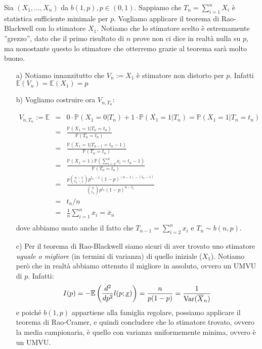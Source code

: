 \begin{esempio}

Sia $(X_1,...,X_n)$ da $b(1,p), p \in (0,1)$. Sappiamo che $T_n=\sum_{i=1}^n X_i$ è statistica sufficiente minimale per $p$. Vogliamo applicare il teorema di Rao-Blackwell con lo stimatore $X_1$. Notiamo che lo stimatore scelto è estremamente ''grezzo'', dato che il primo risultato di $n$ prove non ci dice in realtà nulla su $p$, ma nonostante questo lo stimatore che otterremo grazie al teorema sarà molto buono.

\begin{enumerate}
\item[a)] Notiamo innanzitutto che $V_n:=X_1$ è stimatore non distorto per $p$. Infatti $\mathbb{E}(V_n) = \mathbb{E}(X_1) = p$
\item[b)] Vogliamo costruire ora $V_{n,T_n}$:

\begin{eqnarray*}
V_{n,T_n} := \mathbb{E}
&=& 0 \cdot \mathbb{P} (X_1=0|T_n) + 1 \cdot \mathbb{P}(X_1=1|T_n) = \mathbb{P}(X_1=1|T_n=t_n)\\
&=& \frac{\mathbb{P}(X_1=1|T_n=t_n)}{\mathbb{P}(T_n=t_n)}\\
&=& \frac{\mathbb{P}(X_1=1|T_{n-1}=t_n-1)}{\mathbb{P}(T_n=t_n)}\\
&=& \frac{\mathbb{P}(X_1=1) \mathbb{P}(\sum_{i=2}^n x_i = t_n-1)}{\mathbb{P}(T_n=t_n)}\\
&=& \frac{p \binom{n-1}{t_n-1} p^{t_n-1} (1-p)^{(n-1)-(t_n-1)}}{\binom{n}{t_n} p^{t_n} (1-p)^{n-t_n}}\\
&=& t_n/n\\
&=& \frac{1}{n} \displaystyle\sum_{i=1}^n x_i = \overline{x}_n\\
\end{eqnarray*}
dove abbiamo usato anche il fatto che $T_{n-1}=\sum_{i=2}^n x_i$ e $T_n \sim b(n,p)$.
\item[c)] Per il teorema di Rao-Blackwell siamo sicuri di aver trovato uno stimatore \emph{uguale o migliore} (in termini di varianza) di quello iniziale ($X_1$). Notiamo però che in realtà abbiamo ottenuto il migliore in assoluto, ovvero un UMVU di $p$. Infatti:
$$I(p)=-\mathbb{E} \left( \frac{d^2}{dp^2} l(p;\underline{x}) \right) = \frac{n}{p(1-p)} = \frac{1}{\operatorname{Var}(\overline{X}_n)}$$
e poiché $b(1,p)$ appartiene alla famiglia regolare, possiamo applicare il teorema di Rao-Cramer, e quindi concludere che lo stimatore trovato, ovvero la media campionaria, è quello con varianza uniformemente minima, ovvero è un UMVU.
\end{enumerate}
\end{esempio}

